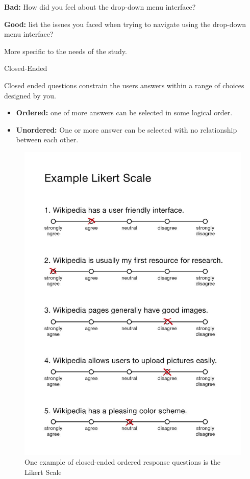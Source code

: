 \documentclass[ignorenonframetext,]{beamer}
\providecommand{\tightlist}{%
  \setlength{\itemsep}{0pt}\setlength{\parskip}{0pt}}
\begin{document}
\begin{frame}

\textbf{Bad:} How did you feel about the drop-down menu interface?

\textbf{Good:} list the issues you faced when trying to navigate using
the drop-down menu interface?

More specific to the needs of the study.

\begin{block}{Closed-Ended}

Closed ended questions constrain the users answers within a range of
choices designed by you.

\begin{itemize}
\tightlist
\item
  \textbf{Ordered:} one of more answers can be selected in some logical
  order.
\item
  \textbf{Unordered:} One or more answer can be selected with no
  relationship between each other.
\end{itemize}

\end{block}

\begin{block}{}

\begin{figure}
\centering
\includegraphics{assets/likert.jpg}
\caption{One example of closed-ended ordered response questions is the
Likert Scale}
\end{figure}


\end{block}
\end{frame}
\end{document}
